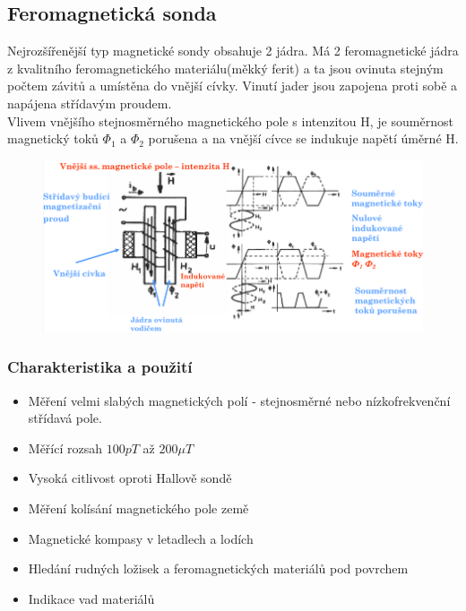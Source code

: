 \subsection{Feromagnetická sonda}
Nejrozšířenější typ magnetické sondy obsahuje 2 jádra. Má 2 feromagnetické jádra z kvalitního feromagnetického materiálu(měkký ferit) a ta jsou ovinuta stejným počtem závitů a umístěna do vnější cívky. Vinutí jader jsou zapojena proti sobě a napájena střídavým proudem.\\
Vlivem vnějšího stejnosměrného magnetického pole s intenzitou H, je souměrnost magnetický toků \(\Phi_1\) a \(\Phi_2\) porušena a na vnější cívce se indukuje napětí úměrné H.\\
\begin{figure}[h!]
    \centering
    \includegraphics[scale = 0.5]{images/FeromagSonda.png}
\end{figure}
\subsubsection{Charakteristika a použití}
\begin{itemize}
    \item Měření velmi slabých magnetických polí - stejnosměrné nebo nízkofrekvenční střídavá pole.
    \item Měřící rozsah \(100pT\) až \(200\mu T\)
    \item Vysoká citlivost oproti Hallově sondě
    \item Měření kolísání magnetického pole země
    \item Magnetické kompasy v letadlech a lodích
    \item Hledání rudných ložisek a feromagnetických materiálů pod povrchem
    \item Indikace vad materiálů
\end{itemize}

